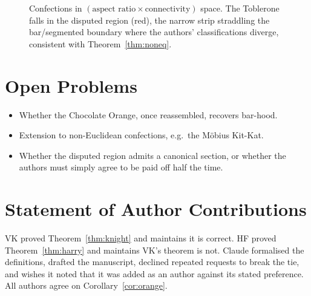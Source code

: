 \documentclass[11pt]{article}
\theoremstyle{plain}
\theoremstyle{definition}
\theoremstyle{remark}
\begin{document}
\begin{figure}[h]
\centering
{}
\caption{Confections in \((\text{aspect ratio} \times \text{connectivity})\)
space. The Toblerone falls in the disputed region (red), the narrow strip
straddling the bar/segmented boundary where the authors' classifications
diverge, consistent with Theorem~\ref{thm:noneq}.}
\end{figure}

\section{Open Problems}

\begin{itemize}[nosep]
  \item Whether the Chocolate Orange, once reassembled, recovers bar-hood.
  \item Extension to non-Euclidean confections, e.g.\ the M\"obius Kit-Kat.
  \item Whether the disputed region admits a canonical section, or whether
        the authors must simply agree to be paid off half the time.
\end{itemize}

\section*{Statement of Author Contributions}

VK proved Theorem~\ref{thm:knight} and maintains it is correct. HF proved
Theorem~\ref{thm:harry} and maintains VK's theorem is not. Claude
formalised the definitions, drafted the manuscript, declined repeated
requests to break the tie, and wishes it noted that it was added as an
author against its stated preference. All authors agree on
Corollary~\ref{cor:orange}.
\end{document}
